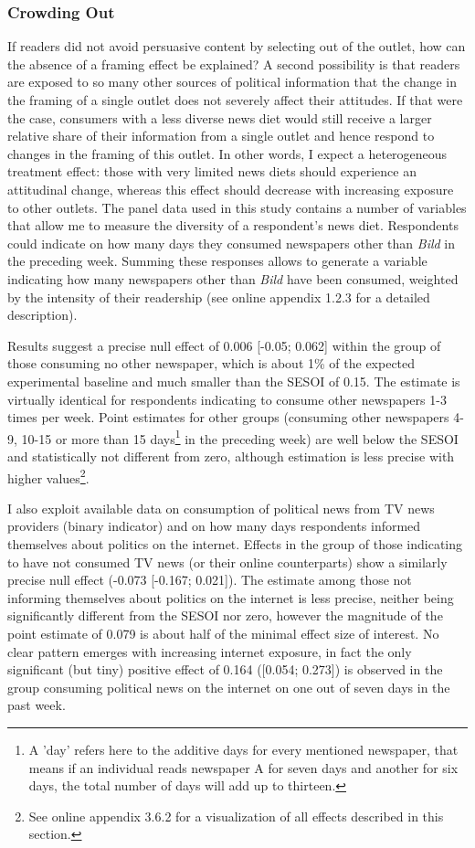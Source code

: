 \documentclass[
  12pt,
]{article}
\begin{document}
\hypertarget{crowding-out}{%
\subsubsection{Crowding Out}\label{crowding-out}}

If readers did not avoid persuasive content by selecting out of the outlet, how can the absence of a framing effect be explained? A second possibility is that readers are exposed to so many other sources of political information that the change in the framing of a single outlet does not severely affect their attitudes. If that were the case, consumers with a less diverse news diet would still receive a larger relative share of their information from a single outlet and hence respond to changes in the framing of this outlet. In other words, I expect a heterogeneous treatment effect: those with very limited news diets should experience an attitudinal change, whereas this effect should decrease with increasing exposure to other outlets. The panel data used in this study contains a number of variables that allow me to measure the diversity of a respondent's news diet. Respondents could indicate on how many days they consumed newspapers other than \emph{Bild} in the preceding week. Summing these responses allows to generate a variable indicating how many newspapers other than \emph{Bild} have been consumed, weighted by the intensity of their readership (see online appendix 1.2.3 for a detailed description).

Results suggest a precise null effect of 0.006 {[}-0.05; 0.062{]} within the group of those consuming no other newspaper, which is about 1\% of the expected experimental baseline and much smaller than the SESOI of 0.15. The estimate is virtually identical for respondents indicating to consume other newspapers 1-3 times per week. Point estimates for other groups (consuming other newspapers 4-9, 10-15 or more than 15 days\footnote{A 'day' refers here to the additive days for every mentioned newspaper, that means if an individual reads newspaper A for seven days and another for six days, the total number of days will add up to thirteen.} in the preceding week) are well below the SESOI and statistically not different from zero, although estimation is less precise with higher values\footnote{See online appendix 3.6.2 for a visualization of all effects described in this section.}.

I also exploit available data on consumption of political news from TV news providers (binary indicator) and on how many days respondents informed themselves about politics on the internet. Effects in the group of those indicating to have not consumed TV news (or their online counterparts) show a similarly precise null effect (-0.073 {[}-0.167; 0.021{]}). The estimate among those not informing themselves about politics on the internet is less precise, neither being significantly different from the SESOI nor zero, however the magnitude of the point estimate of 0.079 is about half of the minimal effect size of interest. No clear pattern emerges with increasing internet exposure, in fact the only significant (but tiny) positive effect of 0.164 ({[}0.054; 0.273{]}) is observed in the group consuming political news on the internet on one out of seven days in the past week.
\end{document}
